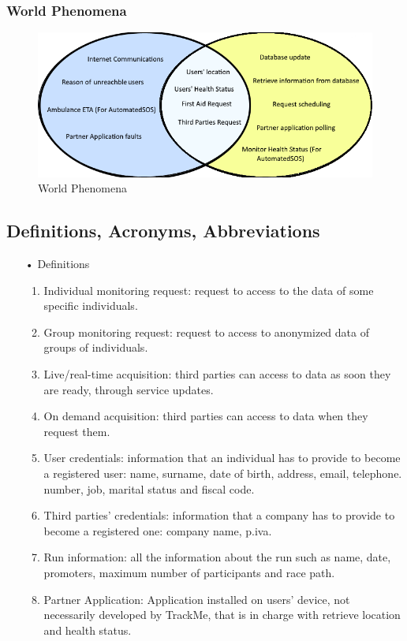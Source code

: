 \subsubsection{World Phenomena}
\begin{figure}
\includegraphics[scale=0.8]{Images/WordPhen.png}
\caption{World Phenomena}
\end{figure}

\subsection{Definitions, Acronyms, Abbreviations}

\begin{enumerate}
\item[•] {\Large Definitions}
	\begin{enumerate}
		\item Individual monitoring request: request to access to the data of some specific  individuals.
		\item Group monitoring request: request to access to anonymized data of groups of individuals.
		\item Live/real-time acquisition: third parties can access to data as soon they are ready, 				through service updates.
		\item On demand acquisition: third parties can access to data when they request 				them.
		\item User credentials: information that an individual has to provide to become a 				registered user: name, surname, date of birth, address, email, telephone.
			number, job, marital status and fiscal code. 
		\item Third parties' credentials: information that a company has to provide to 					become a registered one: company name, p.iva.
		\item Run information: all the information about the run such as name, date, promoters, 				maximum number of participants and race path.
		\item Partner Application: Application installed on users' device, not necessarily developed by TrackMe, that is in charge with retrieve location and health status. 
	\end{enumerate}
\end{enumerate}

